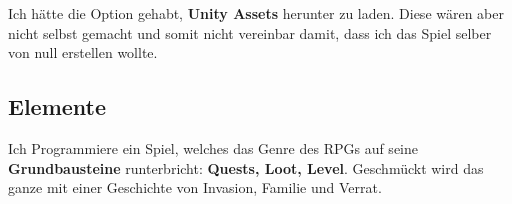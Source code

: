 Ich hätte die Option gehabt, \textbf{Unity Assets} herunter zu laden.
Diese wären aber nicht selbst gemacht und somit nicht vereinbar damit, dass ich das Spiel selber von null erstellen wollte.

\subsection{Elemente}

Ich Programmiere ein Spiel, welches das Genre des RPGs auf seine \textbf{Grundbausteine} runterbricht: \textbf{Quests, Loot, Level}. Geschmückt wird das ganze mit einer Geschichte von Invasion, Familie und Verrat.



